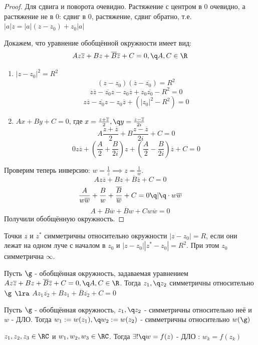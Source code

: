 \begin{proof}
    Для сдвига и поворота очевидно. Растяжение с центром в 0 очевидно, а растяжение не в 0: сдвиг в 0, растяжение, сдвиг обратно, т.е. $|a|z = |a|(z-z_0)+z_0|a|$

    Докажем, что уравнение обобщённой окружности имеет вид:
    \[Az\overline{z} + Bz+\overline{B}\overline{z}+C=0,\q A,C\in\R\]
    \begin{enumerate}
      \item $|z-z_0|^2=R^2$
      \[(z-z_0)(\overline{z}-\overline{z_0})=R^2\]
      \[z\overline{z} - \overline{z_0}z - z_0\overline{z} + z_0\overline{z_0} - R^2 = 0\]
      \[z\overline{z} - \overline{z_0}z - z_0\overline{z} + \left(|z_0|^2 - R^2\right) = 0\]
      \item $Ax+By+C=0$, где $x=\frac{z+\overline{z}}{2},\q y=\frac{z-\overline{z}}{2i}$
      \[A\frac{z+\overline{z}}{2} + B\frac{z-\overline{z}}{2i}+C=0\]
      \[0z\overline{z}+\left(\frac{A}{2} + \frac{B}{2i}\right)z + \left(\frac{A}{2} - \frac{B}{2i}\right)\overline{z} + C = 0\]
    \end{enumerate}
    Проверим теперь инверсию: $w=\frac{1}{z}\implies z = \frac{1}{w}$.
    \[Az\overline{z} + Bz+\overline{B}\overline{z}+C=0\]
    \[\frac{A}{w\overline{w}} + \frac{B}{w} + \frac{\overline{B}}{\overline{w}} + C = 0\q |\q \cdot w\overline{w}\]
    \[A + B\overline{w} + \overline{B}w + Cw\overline{w}=0\]
    Получили обобщённую окружность.
\end{proof}
\begin{definition}
  Точки $z$ и $z^*$ симметричны относительно окружности $|z-z_0|=R$, если они лежат на одном луче с началом в $z_0$ и $|z-z_0||z^*-z_0|=R^2$. При этом $z_0$ симметрична $\infty$. 
\end{definition}
\begin{theorem}
  Пусть $\g$ - обобщённая окружность, задаваемая уравнением $Az\overline{z} + Bz+\overline{B}\overline{z}+C=0,\q A,C\in\R$. Тогда $z_1,\q z_2$ симметричны относительно $\g$ $\lra$ $Az_1\overline{z_2} + Bz_1+\overline{B}\overline{z_2}+C=0$ 
\end{theorem}
\begin{theorem}
  Пусть $\g$ - обобщённая окружность, $z_1,\q z_2$ - симметричны относительно неё и $w$ - ДЛО. Тогда $w_1:=w(z_1),\q w_2:=w(z_2)$ - симметричны относительно $w(\g)$ 
\end{theorem}
\begin{theorem}
  $z_1,z_2,z_3\in\RC$ и $w_1,w_2,w_3\in\RC$. Тогда $\exists!\q w=f(z)$ - ДЛО : $w_k=f(z_k)$ 
\end{theorem}
